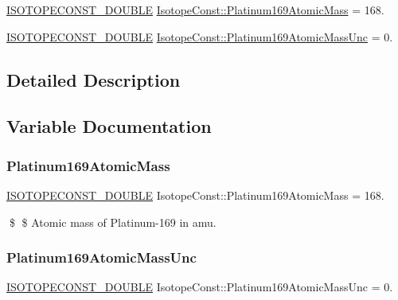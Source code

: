 \begin{DoxyCompactItemize}
\item 
\mbox{\hyperlink{group___isotope_const-_macros_ga8f45a7272ce02c0b4c65c44636ed719a}{I\+S\+O\+T\+O\+P\+E\+C\+O\+N\+S\+T\+\_\+\+D\+O\+U\+B\+LE}} \mbox{\hyperlink{group___isotope_const-_platinum-_pt169_ga0d2f564eda4d6596b72b6f147f71a286}{Isotope\+Const\+::\+Platinum169\+Atomic\+Mass}} = 168.
\item 
\mbox{\hyperlink{group___isotope_const-_macros_ga8f45a7272ce02c0b4c65c44636ed719a}{I\+S\+O\+T\+O\+P\+E\+C\+O\+N\+S\+T\+\_\+\+D\+O\+U\+B\+LE}} \mbox{\hyperlink{group___isotope_const-_platinum-_pt169_ga28263daa64bafbb3c6ed525d84ffcde8}{Isotope\+Const\+::\+Platinum169\+Atomic\+Mass\+Unc}} = 0.
\end{DoxyCompactItemize}


\subsection{Detailed Description}


\subsection{Variable Documentation}
\mbox{\label{group___isotope_const-_platinum-_pt169_ga0d2f564eda4d6596b72b6f147f71a286}} 
\subsubsection{\texorpdfstring{Platinum169\+Atomic\+Mass}{Platinum169AtomicMass}}
{\footnotesize\ttfamily \mbox{\hyperlink{group___isotope_const-_macros_ga8f45a7272ce02c0b4c65c44636ed719a}{I\+S\+O\+T\+O\+P\+E\+C\+O\+N\+S\+T\+\_\+\+D\+O\+U\+B\+LE}} Isotope\+Const\+::\+Platinum169\+Atomic\+Mass = 168.}

\$ \$ Atomic mass of Platinum-\/169 in amu. \mbox{\label{group___isotope_const-_platinum-_pt169_ga28263daa64bafbb3c6ed525d84ffcde8}} 
\subsubsection{\texorpdfstring{Platinum169\+Atomic\+Mass\+Unc}{Platinum169AtomicMassUnc}}
{\footnotesize\ttfamily \mbox{\hyperlink{group___isotope_const-_macros_ga8f45a7272ce02c0b4c65c44636ed719a}{I\+S\+O\+T\+O\+P\+E\+C\+O\+N\+S\+T\+\_\+\+D\+O\+U\+B\+LE}} Isotope\+Const\+::\+Platinum169\+Atomic\+Mass\+Unc = 0.}

